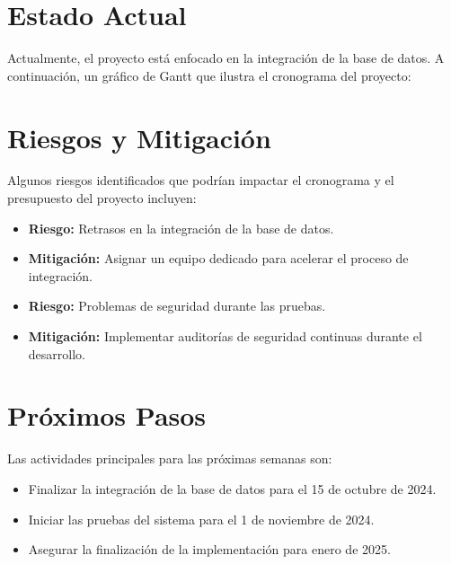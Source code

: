 \documentclass[12pt]{article}
\begin{document}
\section*{Estado Actual}
Actualmente, el proyecto está enfocado en la integración de la base de datos. A continuación, un gráfico de Gantt que ilustra el cronograma del proyecto:

\begin{center}
\end{center}

\section*{Riesgos y Mitigación}
Algunos riesgos identificados que podrían impactar el cronograma y el presupuesto del proyecto incluyen:
\begin{itemize}
    \item \textbf{Riesgo:} Retrasos en la integración de la base de datos.
    \item \textbf{Mitigación:} Asignar un equipo dedicado para acelerar el proceso de integración.
    \item \textbf{Riesgo:} Problemas de seguridad durante las pruebas.
    \item \textbf{Mitigación:} Implementar auditorías de seguridad continuas durante el desarrollo.
\end{itemize}

\section*{Próximos Pasos}
Las actividades principales para las próximas semanas son:
\begin{itemize}
    \item Finalizar la integración de la base de datos para el 15 de octubre de 2024.
    \item Iniciar las pruebas del sistema para el 1 de noviembre de 2024.
    \item Asegurar la finalización de la implementación para enero de 2025.
\end{itemize}
\end{document}
